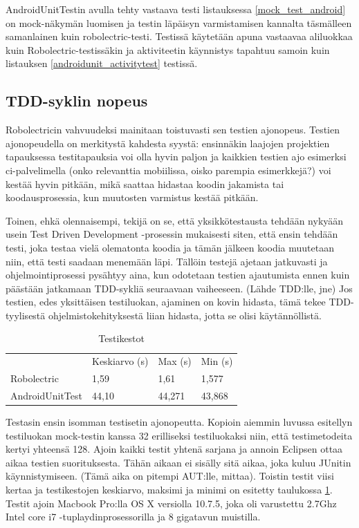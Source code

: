 AndroidUnitTestin avulla tehty vastaava testi listauksessa \ref{mock_test_android} on mock-näkymän luomisen ja testin läpäisyn varmistamisen kannalta täsmälleen samanlainen kuin robolectric-testi. Testissä käytetään apuna vastaavaa aliluokkaa kuin Robolectric-testissäkin ja aktiviteetin käynnistys tapahtuu samoin kuin listauksen \ref{androidunit_activitytest} testissä.

\subsection{TDD-syklin nopeus}

Robolectricin vahvuudeksi mainitaan toistuvasti sen testien ajonopeus. Testien ajonopeudella on merkitystä kahdesta syystä: ensinnäkin laajojen projektien tapauksessa testitapauksia voi olla hyvin paljon ja kaikkien testien ajo esimerksi ci-palvelimella (onko relevanttia mobiilissa, oisko parempia esimerkkejä?) voi kestää hyvin pitkään, mikä saattaa hidastaa koodin jakamista tai koodausprosessia, kun muutosten varmistus kestää pitkään.

Toinen, ehkä olennaisempi, tekijä on se, että yksikkötestausta tehdään nykyään usein Test Driven Development -prosessin mukaisesti siten, että ensin tehdään testi, joka testaa vielä olematonta koodia ja tämän jälkeen koodia muutetaan niin, että testi saadaan menemään läpi. Tällöin testejä ajetaan jatkuvasti ja ohjelmointiprosessi pysähtyy aina, kun odotetaan testien ajautumista ennen kuin päästään jatkamaan TDD-sykliä seuraavaan vaiheeseen. (Lähde TDD:lle, jne) Jos testien, edes yksittäisen testiluokan, ajaminen on kovin hidasta, tämä tekee TDD-tyylisestä ohjelmistokehityksestä liian hidasta, jotta se olisi käytännöllistä.

\begin{table}[h]
\centering
\begin{tabular}{ l l l l }
   & Keskiarvo (s) & Max (s) & Min (s) \\
  Robolectric & 1,59 & 1,61 & 1,577 \\
  AndroidUnitTest & 44,10 & 44,271 & 43,868 \\
\end{tabular}
\caption{Testikestot}
\label{unittest_timing}
\end{table}

Testasin ensin isomman testisetin ajonopeutta. Kopioin aiemmin luvussa esitellyn testiluokan mock-testin kanssa 32 erilliseksi testiluokaksi niin, että testimetodeita kertyi yhteensä 128. Ajoin kaikki testit yhtenä sarjana ja annoin Eclipsen ottaa aikaa testien suorituksesta. Tähän aikaan ei sisälly sitä aikaa, joka kuluu JUnitin käynnistymiseen. (Tämä aika on pitempi AUT:lle, mittaa). Toistin testit viisi kertaa ja testikestojen keskiarvo, maksimi ja minimi on esitetty taulukossa \ref{unittest_timing}. Testit ajoin Macbook Pro:lla OS X versiolla 10.7.5, joka oli varustettu 2.7Ghz Intel core i7 -tuplaydinprosessorilla ja 8 gigatavun muistilla.

